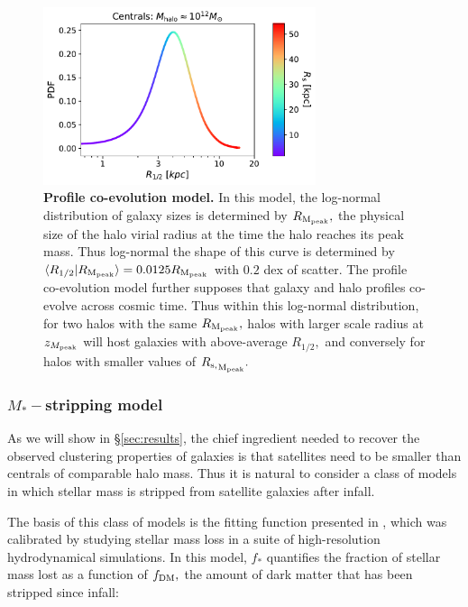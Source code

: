 \documentclass[usenatbib,usegraphicx,letterpaper]{mn2e}
\newcommand{\rhalf}{R_{1/2}}
\newcommand{\mstar}{M_{\ast}}
\newcommand{\zpeak}{z_{M_{\rm peak}}}
\newcommand{\rmpeak}{R_{\rm M_{peak}}}
\newcommand{\rspeak}{{R_{\rm s,}}_{\rm M_{peak}}}
\begin{document}
\begin{figure}
\centering
\includegraphics[width=8cm]{FIGS/rs_correlation_visual.pdf}
\caption{
{\bf Profile co-evolution model.} In this model, the log-normal distribution of galaxy sizes is determined by $\rmpeak,$ the physical size of the halo virial radius at the time the halo reaches its peak mass. Thus log-normal the shape of this curve is determined by $\langle\rhalf\vert\rmpeak\rangle=0.0125\rmpeak$ with $0.2$ dex of scatter. The profile co-evolution model further supposes that galaxy and halo profiles co-evolve across cosmic time. Thus within this log-normal distribution, for two halos with the same $\rmpeak,$ halos with larger scale radius at $\zpeak$ will host galaxies with above-average $\rhalf,$ and conversely for halos with smaller values of $\rspeak.$
}
\label{fig:coevolutionmodel}
\end{figure}

\subsubsection{$\mstar-$stripping model}
\label{subsubsec:strippingmodel}

As we will show in \S\ref{sec:results}, the chief ingredient needed to recover the observed clustering properties of galaxies is that satellites need to be smaller than centrals of comparable halo mass. Thus it is natural to consider a class of models in which stellar mass is stripped from satellite galaxies after infall.

The basis of this class of models is the fitting function presented in \citet{smith_etal16}, which was calibrated by studying stellar mass loss in a suite of high-resolution hydrodynamical simulations. In this model, $f_{\ast}$ quantifies the fraction of stellar mass lost as a function of $f_{\rm DM},$ the amount of dark matter that has been stripped since infall:
\end{document}
